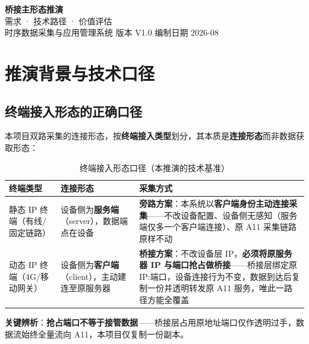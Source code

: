\documentclass[11pt,a4paper]{ctexart}
\begin{document}
\begin{center}
{\Huge\bfseries 桥接主形态推演}\\[10pt]
{\Large 需求 · 技术路径 · 价值评估}\\[8pt]
{\large 时序数据采集与应用管理系统 \quad 版本 V1.0 \quad 编制日期 2026-08}
\end{center}

\vspace{1em}
\noindent\hrulefill
\vspace{1em}

\section{推演背景与技术口径}

\subsection{终端接入形态的正确口径}

本项目双路采集的连接形态，按\textbf{终端接入类型}划分，其本质是\textbf{连接形态}而非数据获取形态：

\begin{table}[H]\centering
\caption{终端接入形态口径（本推演的技术基准）}
\begin{tabular}{p{3.4cm} p{5.0cm} p{5.4cm}}
\toprule
\textbf{终端类型} & \textbf{连接形态} & \textbf{采集方式} \\
\midrule
静态 IP 终端（有线/固定链路） & 设备侧为\textbf{服务端}（server），数据端点在设备 & \textbf{旁路方案}：本系统以\textbf{客户端身份主动连接采集}——不改设备配置、设备侧无感知（服务端仅多一个客户端连接）、原 A11 采集链路原样不动 \\
动态 IP 终端（4G/移动网关） & 设备侧为\textbf{客户端}（client），主动建连至原服务器 & \textbf{桥接方案}：不改设备层 IP，\textbf{必须将原服务器 IP 与端口抢占做桥接}——桥接层绑定原 IP:端口，设备连接行为不变，数据到达后复制一份并透明转发原 A11 服务，唯此一路径方能全覆盖 \\
\bottomrule
\end{tabular}
\end{table}

\textbf{关键辨析}：\textbf{抢占端口不等于接管数据}——桥接层占用原地址端口仅作透明过手，数据流始终全量流向 A11，本项目仅复制一份副本。
\end{document}
